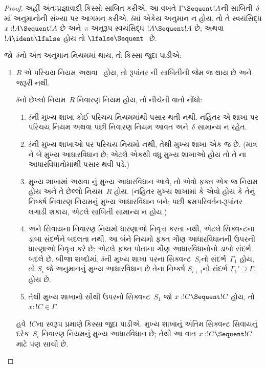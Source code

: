 \begin{proof}
અહીં અંતઃપ્રજ્ઞાવાદી કિસ્સો સાબિત કરીએ.
આ વખતે
$\Gamma \Sequent !A$ની
સાબિતી~$\delta$માં
અનુમાનોની સંખ્યા
પર આગમન કરીએ.
$\delta$માં
એકેય અનુમાન
ન હોય, તો
તે સ્વયંસિદ્ધ
$x:!A \Sequent !A$
છે અને~$\pi$
અનુરૂપ સ્વયંસિદ્ધ
$!A \Sequent !A$
છે; અથવા
$!A
\ident \lfalse$
હોય તો
$\lfalse \Sequent \ $
છે.

જો~$\delta$નો
અંત અનુમાન-નિયમમાં
થાય, તો કિસ્સા
જુદા પાડીએ:
\begin{enumerate}
  \item $R$ એ
  પરિચય
  નિયમ અથવા~\FalseInt
  હોય, તો
  રૂપાંતર
  ની
  સાબિતીની જેમ
  જ થાય છે
  અને~\Cut
  જરૂરી નથી.

  $\delta$નો
  છેલ્લો નિયમ~$R$
  નિવારણ
  નિયમ હોય,
  તો નીચેની
  વાતો નોંધો:
  \begin{enumerate}
    \item $\delta$ની
    મુખ્ય શાખા
    કોઈ પરિચય
    નિયમમાંથી
    પસાર થતી
    નથી. નહિતર
    એ શાખા પર
    પરિચય
    નિયમ અથવા
    \FalseInt{}
    પછી
    નિવારણ
    નિયમ આવત
    અને~$\delta$
    સામાન્ય ન
    રહેત.
    \item $\delta$ની
    મુખ્ય શાખાઓ
    પર પરિચય
    નિયમો નથી,
    તેથી મુખ્ય
    શાખા એક
    જ છે.
    (માત્ર
    \Intro{\land}ને
    બે મુખ્ય
    આધારવિધાન છે;
    એટલે એકથી
    વધુ મુખ્ય
    શાખાઓ હોય
    તો તે
    \Intro{\land}ના
    આધારવિધાનોમાંથી
    પસાર થવી
    પડે.)
    \item મુખ્ય
    શાખામાં
    \Elim{\lor}
    અથવા
    \Elim{\lexists}નું
    મુખ્ય આધારવિધાન
    આવે, તો
    એવો ફક્ત
    એક જ
    નિયમ હોય
    અને તે
    છેલ્લો
    નિયમ~$R$
    હોય.
    (નહિતર
    મુખ્ય શાખામાં
    \Elim{\lor}
    કે
    \Elim{\lexists}
    એવો હોય
    કે તેનું
    નિષ્કર્ષ
    નિવારણ
    નિયમનું મુખ્ય
    આધારવિધાન
    બને; પછી
    ક્રમપરિવર્તન-રૂપાંતર
    લગાડી શકાય,
    એટલે સાબિતી
    સામાન્ય ન
    હોય.)
  \item \Elim{\lor}
  અને
  \Elim{\lexists}
  સિવાયના
  નિવારણ
  નિયમો ધારણાઓ
  નિવૃત્ત કરતા
  નથી, એટલે
  સિક્વન્ટના
  ડાબા સંદર્ભને
  બદલતા નથી.
  આ બંને નિયમો
  ફક્ત ગૌણ
  આધારવિધાનની
  ઉપરની ધારણાઓ
  નિવૃત્ત કરે
  છે; એટલે
  ફક્ત પોતાના
  ગૌણ આધારવિધાનોનો
  ડાબો સંદર્ભ
  બદલે છે.
  બીજા શબ્દોમાં,
  $\delta$ની
  મુખ્ય શાખા
  પરના
  સિક્વન્ટ~$S_i$નો
  સંદર્ભ~$\Gamma_1$
  હોય, તો
  $S_i$ જે
  અનુમાનનું
  મુખ્ય આધારવિધાન
  છે તેના
  નિષ્કર્ષ
  $S_{i+1}$નો
  સંદર્ભ
  $\Gamma_1' \supseteq \Gamma_1$
  હોય છે.
  \item તેથી
  મુખ્ય શાખાનો
  સૌથી ઉપરનો
  સિક્વન્ટ~$S_1$
  જો
  $x: !C \Sequent !C$
  હોય, તો
  $x:!C \in \Gamma$.
  \end{enumerate}
  હવે~$!C$ના
  સ્વરૂપ પ્રમાણે
  કિસ્સા જુદા
  પાડીએ. મુખ્ય
  શાખાનું અંતિમ
  સિક્વન્ટ સિવાયનું
  દરેક~$S_i$
  નિવારણ
  નિયમનું મુખ્ય
  આધારવિધાન છે;
  તેથી આ વાત
  $x:!C \Sequent !C$
  માટે પણ
  સાચી છે.
  


\end{enumerate}
\end{proof}
